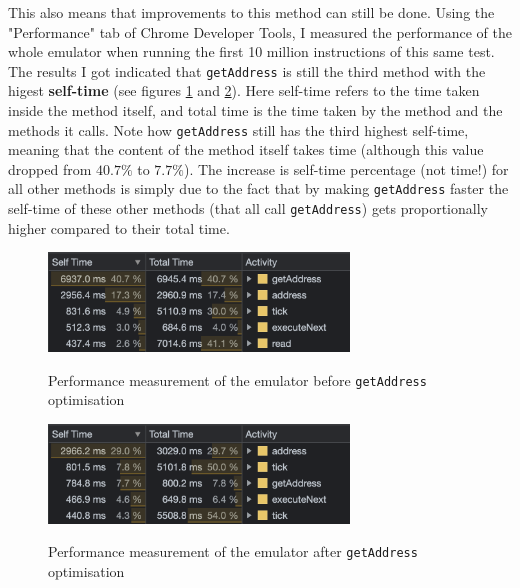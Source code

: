 \documentclass[11pt]{report}
\begin{document}
This also means that improvements to this method can still be done. Using the "Performance" tab of Chrome Developer Tools, I measured the performance of the whole emulator when running the first 10 million instructions of this same test. The results I got indicated that \texttt{getAddress} is still the third method with the higest \textbf{self-time} (see figures \ref{fig:performance-getaddress-before} and \ref{fig:performance-getaddress-after}). Here self-time refers to the time taken inside the method itself, and total time is the time taken by the method and the methods it calls. Note how \texttt{getAddress} still has the third highest self-time, meaning that the content of the method itself takes time (although this value dropped from $40.7\%$ to $7.7\%$). The increase is self-time percentage (not time!) for all other methods is simply due to the fact that by making \texttt{getAddress} faster the self-time of these other methods (that all call \texttt{getAddress}) gets proportionally higher compared to their total time.

\begin{figure}[h]
    \centering
    \includegraphics[width=8cm]{images/get-address-before.png}\\
    \caption{Performance measurement of the emulator before \texttt{getAddress} optimisation}
    \label{fig:performance-getaddress-before}
\end{figure}

\begin{figure}[h]
    \centering
    \includegraphics[width=8cm]{images/get-address-after.png}\\
    \caption{Performance measurement of the emulator after \texttt{getAddress} optimisation}
    \label{fig:performance-getaddress-after}
\end{figure}
\end{document}
